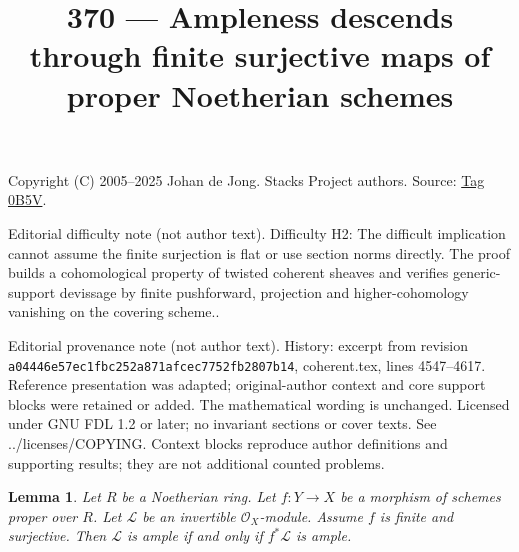 \documentclass{amsart}
\theoremstyle{plain}
\newtheorem{lemma}[subsection]{Lemma}
\theoremstyle{definition}
\theoremstyle{remark}
\numberwithin{equation}{subsection}
\begin{document}
\title[Stacks Project, Tag 0B5V]{370 --- Ampleness descends through finite surjective maps of proper Noetherian schemes}
\maketitle
\noindent Copyright (C) 2005--2025 Johan de Jong. Stacks Project authors. Source: \href{https://stacks.math.columbia.edu/tag/0B5V}{Tag 0B5V}.

\noindent Editorial difficulty note (not author text). Difficulty H2: The difficult implication cannot assume the finite surjection is flat or use section norms directly. The proof builds a cohomological property of twisted coherent sheaves and verifies generic-support devissage by finite pushforward, projection and higher-cohomology vanishing on the covering scheme..

\noindent Editorial provenance note (not author text). History: excerpt from revision \texttt{a0444\allowbreak 6e57e\allowbreak c1fbc\allowbreak 252a8\allowbreak 71afc\allowbreak ec775\allowbreak 2fb28\allowbreak 07b14}, coherent.tex, lines 4547--4617. Reference presentation was adapted; original-author context and core support blocks were retained or added. The mathematical wording is unchanged. Licensed under GNU FDL 1.2 or later; no invariant sections or cover texts. See ../licenses/COPYING. Context blocks reproduce author definitions and supporting results; they are not additional counted problems.

\begin{lemma}
\label{lemma-surjective-finite-morphism-ample}
Let $R$ be a Noetherian ring. Let $f : Y \to X$ be a morphism of
schemes proper over $R$. Let $\mathcal{L}$ be an
invertible $\mathcal{O}_X$-module. Assume $f$ is finite and surjective.
Then $\mathcal{L}$ is ample if and only if $f^*\mathcal{L}$ is ample.
\end{lemma}
\end{document}

